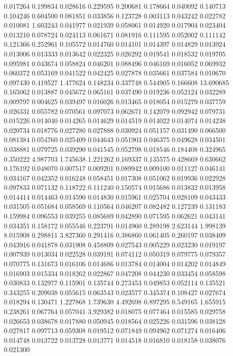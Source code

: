 0.017264
0.199834
0.028616
0.229595
0.200681
0.178664
0.040092
0.140713
0.104246
0.604500
0.081851
0.033856
0.123728
0.003113
0.043242
0.022782
0.010081
1.603243
0.041977
0.021939
0.058061
0.014920
0.017904
0.023404
0.013210
0.078724
0.024113
0.061671
0.081916
0.111595
0.052002
0.111142
0.121366
0.252961
0.105572
0.014760
0.014101
0.014397
0.014829
0.013924
0.013006
0.013333
0.013642
0.022325
0.026292
0.019541
0.018532
0.019705
0.095981
0.043674
0.058824
0.046201
0.088496
0.046169
0.016052
0.069932
0.060372
0.053169
0.041522
0.042425
0.027878
0.035661
0.037584
0.010670
0.097430
0.419527
1.477624
0.148234
0.337748
0.544905
0.166608
13.690685
0.165062
0.013887
0.045672
0.065161
0.037490
0.019236
0.052124
0.032289
0.009797
0.004625
0.039497
0.016026
0.013465
0.018054
0.015279
0.037759
0.026331
0.055782
0.070561
0.097073
0.062671
0.142079
0.092942
0.079731
0.015226
0.014040
0.014265
0.014629
0.014519
0.014022
0.014074
0.014238
0.020734
0.018776
0.027280
0.027888
0.030924
0.051157
0.031490
0.066500
0.081384
0.054760
0.025409
0.044643
0.051903
0.046375
0.049628
0.034501
0.038881
0.079725
0.039290
0.041545
0.052798
0.018546
0.184408
0.324965
0.350222
4.987703
1.745638
1.221262
0.169337
0.135575
0.428669
0.630662
0.176192
0.048070
0.007517
0.009201
0.089942
0.009100
0.011127
0.046141
0.034167
0.042352
0.016248
0.058451
0.017308
0.051062
0.019936
0.022928
0.097833
0.071132
0.118722
0.111240
0.150574
0.015686
0.013832
0.013958
0.014414
0.014463
0.014590
0.014830
0.015961
0.025704
0.028109
0.043433
0.031505
0.051684
0.058569
0.110564
0.046207
0.082482
0.127239
0.131183
0.159984
0.096553
0.039255
0.085689
0.042890
0.071595
0.062621
0.043141
0.034351
0.158172
0.055546
0.223791
0.014960
0.289198
2.623144
1.998139
8.015908
0.298811
3.827360
0.291416
0.386860
0.061405
0.260197
0.038409
0.043916
0.041878
0.031908
0.458809
0.027543
0.005229
0.023230
0.019197
0.007939
0.013034
0.022528
0.039191
0.074112
0.050319
0.079775
0.079357
0.070775
0.131673
0.016106
0.014686
0.013784
0.014004
0.014202
0.014849
0.016903
0.015334
0.018262
0.022867
0.047208
0.044230
0.033454
0.058598
0.030833
0.132977
0.115901
0.135744
0.273453
0.049853
0.052114
0.135521
0.343255
0.209038
0.055615
0.063543
0.023577
0.345374
0.108427
0.027674
0.018294
0.130471
1.227868
1.739630
4.492698
0.897295
0.549165
1.655915
0.238261
0.067764
0.057041
3.929382
0.018075
0.077464
0.015585
0.029758
0.026653
0.038678
0.017880
0.050945
0.018564
0.025226
0.031596
0.038128
0.027817
0.097713
0.059308
0.019512
0.071849
0.094962
0.071274
0.016406
0.014748
0.013722
0.013728
0.013771
0.014518
0.016810
0.018158
0.038076
0.021300
